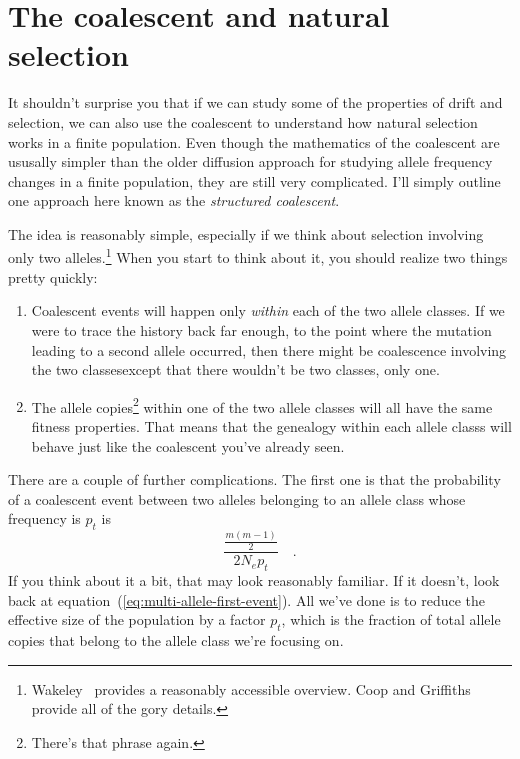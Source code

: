 \section*{The coalescent and natural selection}

It shouldn't surprise you that if we can study some of the properties
of drift and selection, we can also use the coalescent to understand
how natural selection works in a finite population. Even though the
mathematics of the coalescent are ususally simpler than the older
diffusion approach for studying allele frequency changes in a finite
population, they are still very complicated. I'll simply outline one
approach here known as the {\it structured
  coalescent}. 

The idea is reasonably simple, especially if we think about selection
involving only two alleles.\footnote{Wakeley~\cite{Wakeley-2010}
  provides a reasonably accessible overview. Coop and
  Griffiths~\cite{Coop-Griffiths-2004} provide all of the gory
  details.} When you start to think about it, you should realize two
things pretty quickly:

\begin{enumerate}

  \item Coalescent events will happen only {\it within} each of the
    two allele classes. If we were to trace the history back far
    enough, to the point where the mutation leading to a second allele
    occurred, then there might be coalescence involving the two
    classes{\dash}except that there wouldn't be two classes, only
    one.

  \item The allele copies\footnote{There's that phrase again.} within
    one of the two allele classes will all have the same fitness
    properties. That means that the genealogy within each allele
    classs will behave just like the coalescent you've already seen.
    
 \end{enumerate}
There are a couple of further complications. The first one is that the
probability of a coalescent event between two alleles belonging to an
allele class whose frequency is $p_t$ is
\[
 \frac{\frac{m(m-1)}{2}}{2N_ep_t} \quad .
 \]
If you think about it a bit, that may look reasonably familiar. If it
doesn't, look back at equation~(\ref{eq:multi-allele-first-event}). All
we've done is to reduce the effective size of the population by a
factor $p_t$, which is the fraction of total allele copies that belong
to the allele class we're focusing on.

